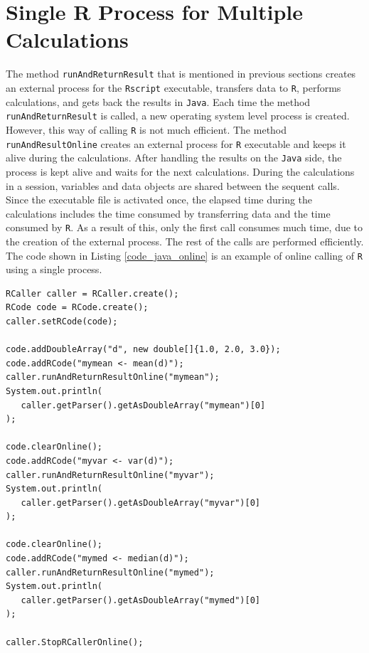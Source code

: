 \documentclass[10pt,a4paper, final, oneside]{article}
\begin{document}
\section{Single R Process for Multiple Calculations}
\label{sec:single_R_Process_for_multiple_calculations}
The method \texttt{runAndReturnResult} that is mentioned in previous sections creates an external process for the \texttt{Rscript} executable, transfers data to \texttt{R}, performs calculations, and gets back the results in \texttt{Java}. Each time the method \texttt{runAndReturnResult} is called, a new operating system level process is created. However, this way of calling \texttt{R} is not much efficient. The method \texttt{runAndResultOnline} creates an external process for \texttt{R} executable and keeps it alive during the calculations. After handling the results on the \texttt{Java} side, the process is kept alive and waits for the next calculations. During the calculations in a session, variables and data objects are shared between the sequent calls. Since the executable file is activated once, the elapsed time during the calculations includes the time consumed by transferring data and the time consumed by \texttt{R}. As a result of this, only the first call consumes much time, due to the creation of the external process. The rest of the calls are performed efficiently. The code shown in Listing \ref{code_java_online} is an example of online calling of \texttt{R} using a single process.


\begin{minipage}{\linewidth}
\begin{lstlisting}[caption=RCaller Online,label=code_java_online]
RCaller caller = RCaller.create();
RCode code = RCode.create();
caller.setRCode(code);

code.addDoubleArray("d", new double[]{1.0, 2.0, 3.0});
code.addRCode("mymean <- mean(d)");
caller.runAndReturnResultOnline("mymean");
System.out.println(
   caller.getParser().getAsDoubleArray("mymean")[0]
);

code.clearOnline();
code.addRCode("myvar <- var(d)");
caller.runAndReturnResultOnline("myvar");
System.out.println(
   caller.getParser().getAsDoubleArray("myvar")[0]
);

code.clearOnline();
code.addRCode("mymed <- median(d)");
caller.runAndReturnResultOnline("mymed");
System.out.println(
   caller.getParser().getAsDoubleArray("mymed")[0]
);

caller.StopRCallerOnline();
\end{lstlisting}
\end{minipage}
\end{document}

